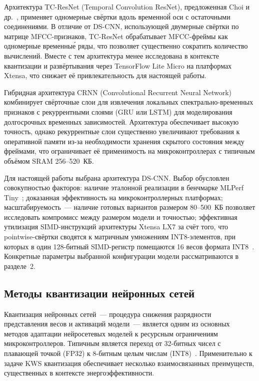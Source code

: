 Архитектура TC-ResNet (Temporal Convolution ResNet), предложенная Choi
и др.~\cite{src:12}, применяет одномерные свёртки вдоль временно\'{й}
оси с остаточными соединениями. В отличие от DS-CNN, использующей
двумерные свёртки по матрице MFCC-признаков, TC-ResNet обрабатывает
MFCC-фреймы как одномерные временны\'{е} ряды, что позволяет существенно
сократить количество вычислений. Вместе с тем архитектура менее
исследована в контексте квантизации и развёртывания через TensorFlow
Lite Micro на платформах Xtensa, что снижает её привлекательность для
настоящей работы.

Гибридная архитектура CRNN (Convolutional Recurrent Neural Network)
комбинирует свёрточные слои для извлечения локальных
спектрально-временных признаков с рекуррентными слоями (GRU или LSTM)
для моделирования долгосрочных временных зависимостей. Архитектура
обеспечивает высокую точность, однако рекуррентные слои существенно
увеличивают требования к оперативной памяти из-за необходимости хранения
скрытого состояния между фреймами, что ограничивает её применимость на
микроконтроллерах с типичным объёмом SRAM 256--520~КБ.

Для настоящей работы выбрана архитектура DS-CNN. Выбор обусловлен
совокупностью факторов: наличие эталонной реализации в бенчмарке MLPerf
Tiny~\cite{src:5}; доказанная эффективность на микроконтроллерных
платформах; масштабируемость~--- наличие готовых вариантов размером
80--500~КБ позволяет исследовать компромисс между размером модели и
точностью; эффективная утилизация SIMD-инструкций архитектуры Xtensa
LX7 за счёт того, что pointwise-свёртки сводятся к матричным умножениям
INT8-элементов, при которых в один 128-битный SIMD-регистр помещаются
16 весов формата INT8~\cite{src:9}. Конкретные параметры выбранной
конфигурации модели рассматриваются в разделе~2.

\subsection{Методы квантизации нейронных сетей}

Квантизация нейронных сетей~--- процедура снижения разрядности
представления весов и активаций модели~--- является одним из основных
методов адаптации нейросетевых моделей к ресурсным ограничениям
микроконтроллеров. Типичным является переход от 32-битных чисел с
плавающей точкой (FP32) к 8-битным целым числам (INT8)~\cite{src:3}.
Применительно к задаче KWS квантизация обеспечивает несколько
взаимосвязанных преимуществ, существенных в контексте энергоэффективности.

